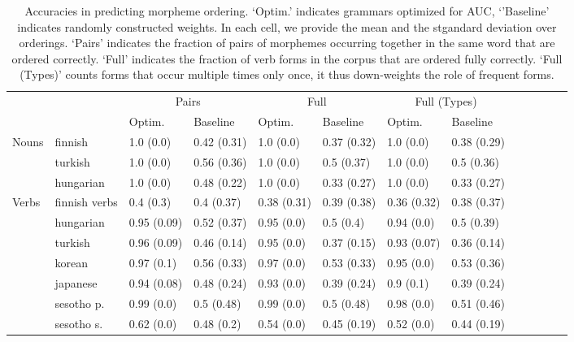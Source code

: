 \documentclass[11pt,letterpaper]{article}
\begin{document}
\begin{table}[]
    \centering
    \begin{tabular}{l|l|ll|lllllllll}
    &     &    \multicolumn{2}{c|}{Pairs} & \multicolumn{2}{c|}{Full} & \multicolumn{2}{c}{Full (Types)} \\
     &   &     Optim. & Baseline & Optim. & Baseline & Optim. & Baseline \\ \hline
Nouns & finnish  & 1.0 (0.0) & 0.42 (0.31) & 1.0 (0.0) & 0.37 (0.32) & 1.0 (0.0) & 0.38 (0.29) \\
 & turkish  & 1.0 (0.0) & 0.56 (0.36) & 1.0 (0.0) & 0.5 (0.37) & 1.0 (0.0) & 0.5 (0.36) \\
 & hungarian  & 1.0 (0.0) & 0.48 (0.22) & 1.0 (0.0) & 0.33 (0.27) & 1.0 (0.0) & 0.33 (0.27) \\
 \hline
Verbs & finnish verbs & 0.4 (0.3) & 0.4 (0.37) & 0.38 (0.31) & 0.39 (0.38) & 0.36 (0.32) & 0.38 (0.37) \\
 & hungarian  & 0.95 (0.09) & 0.52 (0.37) & 0.95 (0.0) & 0.5 (0.4) & 0.94 (0.0) & 0.5 (0.39) \\
 & turkish  & 0.96 (0.09) & 0.46 (0.14) & 0.95 (0.0) & 0.37 (0.15) & 0.93 (0.07) & 0.36 (0.14) \\
 & korean & 0.97 (0.1) & 0.56 (0.33) & 0.97 (0.0) & 0.53 (0.33) & 0.95 (0.0) & 0.53 (0.36) \\
 & japanese & 0.94 (0.08) & 0.48 (0.24) & 0.93 (0.0) & 0.39 (0.24) & 0.9 (0.1) & 0.39 (0.24) \\
 & sesotho p. & 0.99 (0.0) & 0.5 (0.48) & 0.99 (0.0) & 0.5 (0.48) & 0.98 (0.0) & 0.51 (0.46) \\
 & sesotho s. & 0.62 (0.0) & 0.48 (0.2) & 0.54 (0.0) & 0.45 (0.19) & 0.52 (0.0) & 0.44 (0.19) \\
    \end{tabular}
    \caption{Accuracies in predicting morpheme ordering. `Optim.' indicates grammars optimized for AUC, `'Baseline' indicates randomly constructed weights.
    In each cell, we provide the mean and the stgandard deviation over orderings. `Pairs' indicates the fraction of pairs of morphemes occurring together in the same word that are ordered correctly. `Full' indicates the fraction of verb forms in the corpus that are ordered fully correctly. `Full (Types)' counts forms that occur multiple times only once, it thus down-weights the role of frequent forms.}
    \label{tab:optimized_acc}
\end{table}
\end{document}
